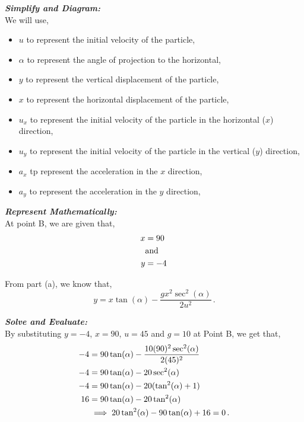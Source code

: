 \begin{subquestions}
\begin{subsubquestions}
\textbf{\textit{Simplify and Diagram:}} \\
We will use,
\begin{itemize}
	\item $u$ to represent the initial velocity of the particle,
	\item $\alpha$ to represent the angle of projection to the horizontal,
	\item $y$ to represent the vertical displacement of the particle,
	\item $x$ to represent the horizontal displacement of the particle,
	\item $u_x$ to represent the initial velocity of the particle in the horizontal ($x$) direction,
	\item $u_y$ to represent the initial velocity of the particle in the vertical ($y$) direction,
	\item $a_x$ tp represent the acceleration in the $x$ direction,
	\item $a_y$ to represent the acceleration in the $y$ direction,
\end{itemize}  




\textbf{\textit{Represent Mathematically:}} \\
At point B, we are given that,
\begin{align}
	x & = 90 \\
	  & \text{and} \nonumber \\
	y & = -4 \,
\end{align}

From part (a), we know that,
\begin{equation}
	y = x\tan(\alpha) - \frac{gx^2\sec^2(\alpha)}{2u^2} \,.
\end{equation}




\textbf{\textit{Solve and Evaluate:}} \\
By substituting $y=-4$, $x=90$, $u=45$ and $g=10$ at Point B, we get that,
\begin{align}
	-4 & = 90\tan(\alpha) - \frac{10(90)^2\sec^2(\alpha)}{2(45)^2} \nonumber \\
	-4 & = 90\tan(\alpha) - 20\sec^2(\alpha) \nonumber \\
	-4 & = 90\tan(\alpha) - 20(\tan^2(\alpha)+1) \nonumber \\
	16 & = 90\tan(\alpha) - 20\tan^2(\alpha) \nonumber \\
	&\implies 20\tan^2(\alpha)-90\tan(\alpha)+16 = 0 \,.
\end{align}


\end{subsubquestions}
\end{subquestions}
